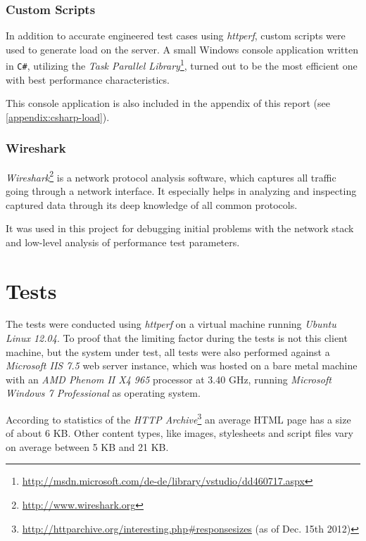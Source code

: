 \subsubsection{Custom Scripts}

In addition to accurate engineered test cases using \textit{httperf}, custom scripts were used to generate load on the server. A small Windows console application written in \texttt{C\#}, utilizing the \textit{Task Parallel Library}\footnote{\url{http://msdn.microsoft.com/de-de/library/vstudio/dd460717.aspx}}, turned out to be the most efficient one with best performance characteristics.

This console application is also included in the appendix of this report (see \ref{appendix:csharp-load}).
\\

\subsubsection{Wireshark}

\textit{Wireshark}\footnote{\url{http://www.wireshark.org}} is a network protocol analysis software, which captures all traffic going through a network interface. It especially helps in analyzing and inspecting captured data through its deep knowledge of all common protocols.

It was used in this project for debugging initial problems with the network stack and low-level analysis of performance test parameters.
\\

\section{Tests}

The tests were conducted using \textit{httperf} on a virtual machine running \textit{Ubuntu Linux 12.04}. To proof that the limiting factor during the tests is not this client machine, but the system under test, all tests were also performed against a \textit{Microsoft IIS 7.5} web server instance, which was hosted on a bare metal machine with an \textit{AMD Phenom II X4 965} processor at 3.40 GHz, running \textit{Microsoft Windows 7 Professional} as operating system.

According to statistics of the \textit{HTTP Archive}\footnote{\url{http://httparchive.org/interesting.php\#responsesizes} (as of Dec. 15th 2012)} an average HTML page has a size of about 6 KB. Other content types, like images, stylesheets and script files vary on average between 5 KB and 21 KB. 

